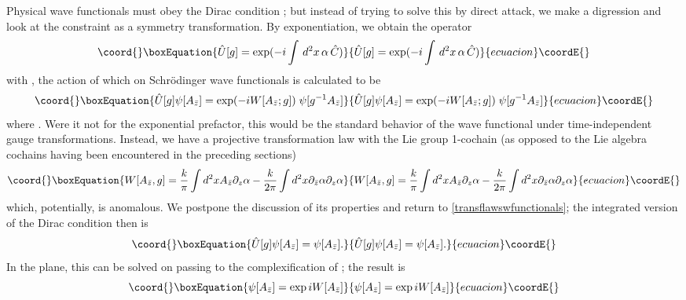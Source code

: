\documentclass[a4paper,10pt]{article}
\begin{document}
Physical wave functionals must obey the Dirac condition \coordHE{};  
but instead of trying to solve this by direct attack, we make a digression and look at 
the constraint as a symmetry transformation. By exponentiation, we obtain the operator
\begin{equation}\coord{}\boxEquation{\hat{U}[g]=\mathrm{exp}(-i\int\,d^2x\,\alpha\,\hat{C}) }{\hat{U}[g]=\mathrm{exp}(-i\int\,d^2x\,\alpha\,\hat{C}) }{ecuacion}\coordE{}\end{equation}
with \coordHE{}, the action of which on Schr\"{o}dinger wave 
functionals is calculated to be
\begin{equation}\coord{}\boxEquation{\label{transflawswfunctionals}
\hat{U}[g]\psi[A_{\bar{z}}]=\mathrm{exp}(-iW[A_{\bar{z}};g])\;
\psi[g^{-1}A_{\bar{z}}]
}{\hat{U}[g]\psi[A_{\bar{z}}]=\mathrm{exp}(-iW[A_{\bar{z}};g])\;
\psi[g^{-1}A_{\bar{z}}]
}{ecuacion}\coordE{}\end{equation}
where \coordHE{}. Were it not for the 
exponential prefactor, this would be the standard behavior of the wave functional under 
time-independent gauge transformations. Instead, we have a projective transformation law 
with the Lie group 1-cochain (as opposed to the Lie algebra cochains having been 
encountered in the preceding sections)
\begin{equation}\coord{}\boxEquation{
W[A_{\bar{z}},g]=\frac{k}{\pi}\int d^2x 
A_{\bar{z}}\partial_z\alpha-
\frac{k}{2\pi}\int d^2x \partial_{\bar{z}}\alpha\partial_z\alpha
}{
W[A_{\bar{z}},g]=\frac{k}{\pi}\int d^2x 
A_{\bar{z}}\partial_z\alpha-
\frac{k}{2\pi}\int d^2x \partial_{\bar{z}}\alpha\partial_z\alpha
}{ecuacion}\coordE{}\end{equation}
which, potentially, is anomalous. We postpone the discussion of its properties and return 
to \eqref{transflawswfunctionals}; the integrated version of the Dirac condition then is
\begin{equation}\coord{}\boxEquation{
\hat{U}[g]\psi[A_{\bar{z}}]=\psi[A_{\bar{z}}].
}{
\hat{U}[g]\psi[A_{\bar{z}}]=\psi[A_{\bar{z}}].
}{ecuacion}\coordE{}\end{equation}
In the plane, this can be solved on passing to the complexification of \coordHE{}; the result 
is 
\begin{equation}\coord{}\boxEquation{
\psi[A_{\bar{z}}]=\exp iW[A_{\bar{z}}]
}{
\psi[A_{\bar{z}}]=\exp iW[A_{\bar{z}}]
}{ecuacion}\coordE{}\end{equation}
\end{document}
